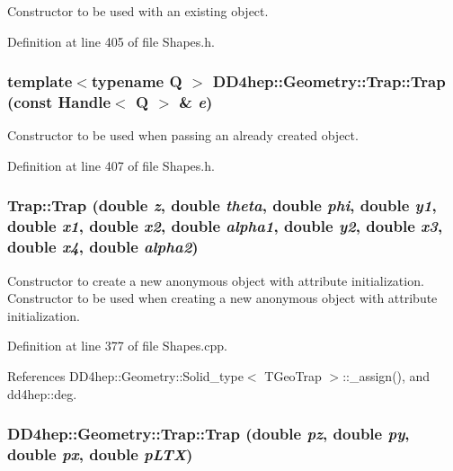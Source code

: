Constructor to be used with an existing object. 

Definition at line 405 of file Shapes.h.\hypertarget{class_d_d4hep_1_1_geometry_1_1_trap_ab9fd21cf871d7796a80cad5c3b20ddb4}{
\subsubsection[{Trap}]{\setlength{\rightskip}{0pt plus 5cm}template$<$typename Q $>$ DD4hep::Geometry::Trap::Trap (const {\bf Handle}$<$ Q $>$ \& {\em e})}}
\label{class_d_d4hep_1_1_geometry_1_1_trap_ab9fd21cf871d7796a80cad5c3b20ddb4}


Constructor to be used when passing an already created object. 

Definition at line 407 of file Shapes.h.\hypertarget{class_d_d4hep_1_1_geometry_1_1_trap_a94f6d7bb5674a6d9f885fd0a90f0afe7}{
\subsubsection[{Trap}]{\setlength{\rightskip}{0pt plus 5cm}Trap::Trap (double {\em z}, \/  double {\em theta}, \/  double {\em phi}, \/  double {\em y1}, \/  double {\em x1}, \/  double {\em x2}, \/  double {\em alpha1}, \/  double {\em y2}, \/  double {\em x3}, \/  double {\em x4}, \/  double {\em alpha2})}}
\label{class_d_d4hep_1_1_geometry_1_1_trap_a94f6d7bb5674a6d9f885fd0a90f0afe7}


Constructor to create a new anonymous object with attribute initialization. Constructor to be used when creating a new anonymous object with attribute initialization. 

Definition at line 377 of file Shapes.cpp.

References DD4hep::Geometry::Solid\_\-type$<$ TGeoTrap $>$::\_\-assign(), and dd4hep::deg.\hypertarget{class_d_d4hep_1_1_geometry_1_1_trap_aaefea9c824b382d67d0b5d6b3fe3f62d}{
\subsubsection[{Trap}]{\setlength{\rightskip}{0pt plus 5cm}DD4hep::Geometry::Trap::Trap (double {\em pz}, \/  double {\em py}, \/  double {\em px}, \/  double {\em pLTX})}}
\label{class_d_d4hep_1_1_geometry_1_1_trap_aaefea9c824b382d67d0b5d6b3fe3f62d}


